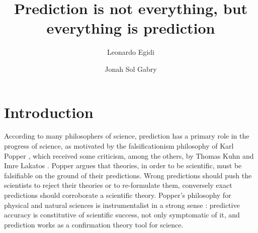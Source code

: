 \documentclass{statsoc}
\title[]{Prediction is not everything, but everything is prediction}
\author[Egidi and Gabry]{Leonardo Egidi}
\author[Egidi and Gabry]{Jonah Sol Gabry}
\begin{document}
\maketitle

\begin{abstract}


\end{abstract}

\section{Introduction}

According to many philosophers of science, prediction has a primary role in the progress of science, as motivated by the falsificationism philosophy of Karl Popper 
\citep{popper1934logic}, which received some criticism, among the others, by Thomas Kuhn \citep{kuhn1962structure} and Imre Lakatos \citep{lakatos1976falsification}. Popper argues 
that theories, in order to be scientific, must be falsifiable on the ground of their  predictions. Wrong predictions should push the scientists to reject their theories or to 
re-formulate them, conversely exact predictions should corroborate a scientific theory.  Popper's philosophy for physical and natural sciences is instrumentalist 
 in a strong sense \citep{hitchcock2004prediction}: predictive accuracy is constitutive of scientific success, not only symptomatic of it, and  prediction works as a confirmation theory tool for science. 
\end{document}
